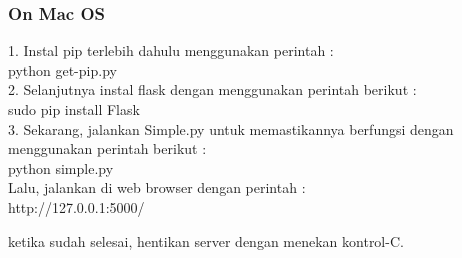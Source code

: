 \documentclass[12pt,a4paper]{article}
\begin{document}
\subsubsection{On Mac OS}
1. Instal pip terlebih dahulu menggunakan perintah :\\
	python get-pip.py\\

2. Selanjutnya instal flask dengan menggunakan perintah berikut :\\
	sudo pip install Flask\\

3. Sekarang, jalankan Simple.py untuk memastikannya berfungsi dengan menggunakan perintah berikut :\\
	python simple.py\\

Lalu, jalankan di web browser dengan perintah :\\
http://127.0.0.1:5000/

ketika sudah selesai, hentikan server dengan menekan kontrol-C.
\end{document}
